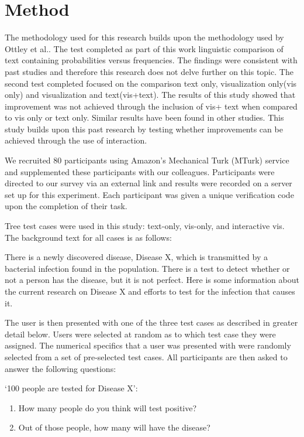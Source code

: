 \section{Method}
The methodology used for this research builds upon the methodology used by
Ottley et al.\cite{Ottley2016}. The test completed as part of this work 
linguistic comparison of text containing probabilities versus frequencies.
The findings were consistent with past studies and therefore this research
does not delve further on this topic. The second test completed focused on
the comparison text only, visualization only(vis only) and visualization and
text(vis+text). The results of this study showed that improvement was not
achieved through the inclusion of vis+ text when compared to vis only or text
only. Similar results have been found in other studies. This study builds
upon this past research by testing whether improvements can be achieved
through the use of interaction.

We recruited 80 participants using Amazon's Mechanical Turk (MTurk) service and supplemented these participants with our colleagues. Participants were directed to our survey via an external link and results were recorded on a server set up for this experiment. Each participant was given a unique verification code upon the completion of their task. 

Tree test cases were used in this study: text-only, vis-only, and interactive vis. The background text for all cases is as follows:

\begin{displayquote}
    There is a newly discovered disease, Disease X, which is transmitted by a bacterial infection found in the population. There is a test to detect whether or not a person has the disease, but it is not perfect. Here is some information about the current research on Disease X and efforts to test for the infection that causes it.
\end{displayquote}

The user is then presented with one of the three test cases as described in greater detail below. Users were selected at random as to which test case they were assigned. The numerical specifics that a user was presented with were randomly selected from a set of pre-selected test cases. All participants are then asked to answer the following questions:

‘100 people are tested for Disease X’:
\begin{enumerate}
    \item How many people do you think will test positive?
    \item Out of those people, how many will have the disease? 
\end{enumerate}

